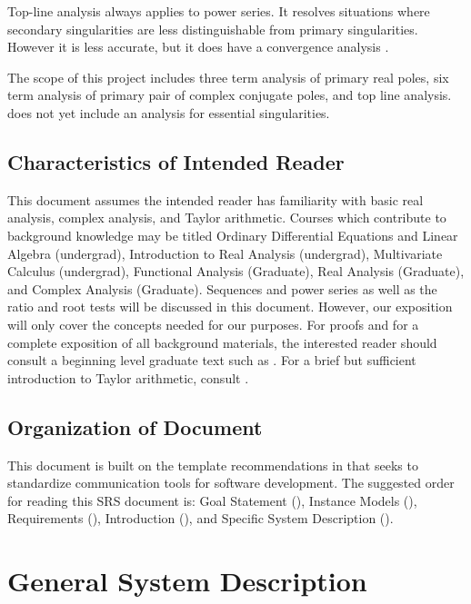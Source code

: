 \documentclass[12pt]{article}
\begin{document}
Top-line analysis always applies to power series. It resolves situations where secondary singularities are
less distinguishable from primary singularities. However it is less accurate, but it does
have a convergence analysis \citep{chang1982}.

The scope of this  project includes three term analysis of primary real poles,
six term analysis of primary pair of complex conjugate poles, and top line analysis.
 does not yet include an analysis for essential singularities.

\subsection{Characteristics of Intended Reader} \label{sec_IntendedReader}

This document assumes the intended reader has familiarity with basic real analysis, complex analysis,
and Taylor arithmetic.
Courses which contribute to background knowledge may be titled Ordinary Differential Equations and
Linear Algebra (undergrad), Introduction to Real Analysis (undergrad),
Multivariate Calculus (undergrad), Functional Analysis (Graduate), Real Analysis (Graduate),
and Complex Analysis (Graduate).
Sequences and power series as well as the ratio and root tests will be discussed
in this document. However, our exposition will only cover the concepts needed for our purposes. For proofs
and for a complete exposition of all background materials, the interested reader should consult a beginning
level graduate text such as \cite{rudin1976}. For a brief but sufficient introduction to Taylor arithmetic,
consult \cite{TADIFF}.

\subsection{Organization of Document}

This document is built on the template recommendations in \citet{SmithAndLai2005, SmithEtAl2007} that
 seeks to standardize communication tools for software development. The suggested order for reading
 this SRS document is: Goal Statement (), Instance Models (),
 Requirements (), Introduction (), and
 Specific System Description ().

\section{General System Description}
\end{document}
